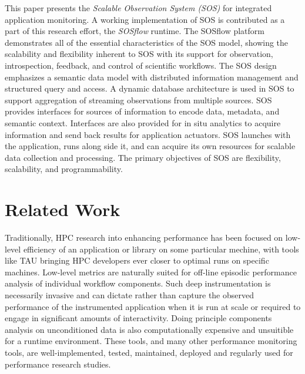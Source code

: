 This paper presents the \textit{Scalable Observation System (SOS)} for
integrated application monitoring.
%
A working implementation of SOS is contributed as a part of this
research effort, the \textit{SOSflow} runtime.
%
The SOSflow platform demonstrates all of the essential characteristics
of the SOS model, showing the scalability and flexibility inherent to
SOS with its support for observation, introspection, feedback, and
control of scientific workflows.
%
The SOS design emphasizes a semantic data model with distributed
information management and structured query and access.
%
A dynamic database architecture is used in SOS to support aggregation
of streaming observations from multiple sources.
%
SOS provides interfaces for sources of information to encode data,
metadata, and semantic context.
%
Interfaces are also provided for in situ analytics to acquire
information and send back results for application actuators.
%
SOS launches with the application, runs along side it, and can acquire
its own resources for scalable data collection and processing.
%
The primary objectives of SOS are flexibility, scalability, and
programmability.



\section{Related Work}

Traditionally, HPC research into enhancing performance has been
focused on low-level efficiency of an application or library on some
particular mechine, with tools like TAU bringing HPC developers ever
closer to optimal runs on specific machines.
%
Low-level metrics are naturally suited for off-line episodic
performance analysis of individual workflow components.
%
Such deep instrumentation is necessarily invasive and can dictate
rather than capture the observed performance of the instrumented
application when it is run at scale or required to engage in
significant amounts of interactivity.
%
Doing principle components analysis on unconditioned data is also
computationally expensive and unsuitible for a runtime environment.
%
These tools, and many other performance monitoring tools, are
well-implemented, tested, maintained, deployed and regularly used for
performance research studies.


